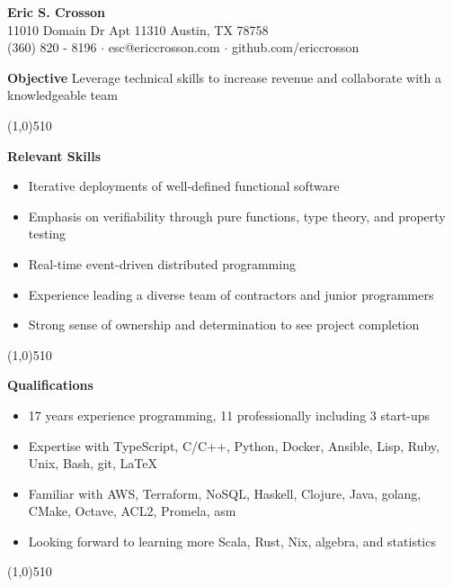 \documentclass{report}
\newcommand{\cut}{\begin{center} \line(1,0){510} \end{center}}
\begin{document}
\pagestyle{empty}
\setlength\parindent{0pt}

\begin{center}
  \textbf{Eric S. Crosson} \\
  11010 Domain Dr Apt 11310 Austin, TX 78758 \\
  (360) 820 - 8196 $\cdot$ esc@ericcrosson.com $\cdot$ github.com/ericcrosson
\end{center}

\textbf{Objective} \hspace{1mm} Leverage technical skills to increase
revenue and collaborate with a knowledgeable team

\cut{}

\textbf{Relevant Skills}
\begin{itemize}[label=$\cdot$]
\item Iterative deployments of well-defined functional software
\item Emphasis on verifiability through pure functions, type theory, and property testing
\item Real-time event-driven distributed programming
\item Experience leading a diverse team of contractors and junior programmers
\item Strong sense of ownership and determination to see project completion
\end{itemize}

\cut{}

\textbf{Qualifications}
\begin{itemize}[label=$\cdot$]
\item 17 years experience programming, 11 professionally including 3 start-ups
\item Expertise with TypeScript, C/C++, Python, Docker, Ansible, Lisp, Ruby, Unix, Bash, git, \LaTeX{}
\item Familiar with AWS, Terraform, NoSQL, Haskell, Clojure, Java, golang, CMake, Octave, ACL2, Promela, asm
\item Looking forward to learning more Scala, Rust, Nix, algebra, and statistics
\end{itemize}

\cut{}
\end{document}

